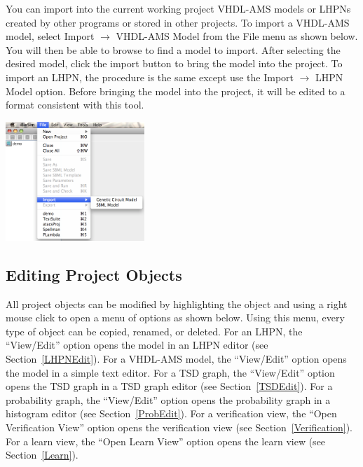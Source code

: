 \documentclass[titlepage,11pt]{article}
\begin{document}
\noindent
You can import into the current working project VHDL-AMS models
or LHPNs created by other programs or stored in other projects. 
To import a VHDL-AMS model, select Import $\rightarrow$ VHDL-AMS Model
from the File menu as shown below. You will then be able to browse to
find a model to import.  After  selecting the desired model, click the 
import button to bring the model into the project. 
To import an LHPN, the procedure is the same except use the 
Import $\rightarrow$ LHPN Model option.  Before bringing the model
into the project, it will be edited to a format consistent with this tool.  
\begin{center}
\includegraphics[height=45mm]{screenshots/import}
\end{center} 

\subsection{Editing Project Objects}

\noindent
All project objects can be modified by highlighting the object
and using a right mouse click to open a menu of options as shown
below. Using this menu, every type of object can be copied, renamed, or
deleted. For an LHPN, the ``View/Edit'' option opens the
model in an LHPN editor (see Section~\ref{LHPNEdit}). For a VHDL-AMS model,
the ``View/Edit'' option opens the model in a simple text editor. For a TSD
graph, the ``View/Edit'' 
option opens the TSD graph in a TSD graph editor (see Section~\ref{TSDEdit}). 
For a probability graph, the ``View/Edit'' option opens
the probability graph in a histogram editor 
(see Section~\ref{ProbEdit}). 
For a verification view, the ``Open Verification View'' option opens the
verification view (see Section~\ref{Verification}). For a learn view, the
``Open Learn View'' option opens the learn view (see Section~\ref{Learn}).
\end{document}
